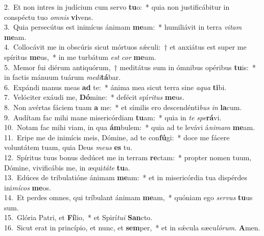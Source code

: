 {2.~}Et non intres in judícium cum servo \textbf{tu}o:~* quia non justificábitur in conspéctu tuo \textit{om}\textit{nis} \textbf{vi}vens.\\
{3.~}Quia persecútus est inimícus ánimam \textbf{me}am:~* humiliávit in terra \textit{vi}\textit{tam} \textbf{me}am.\\
{4.~}Collocávit me in obscúris sicut mórtuos sǽculi:~† et anxiátus est super me spíritus \textbf{me}us,~* in me turbátum \textit{est} \textit{cor} \textbf{me}um.\\
{5.~}Memor fui diérum antiquórum,~† meditátus sum in ómnibus opéribus \textbf{tu}is:~* in factis mánuum tuárum \textit{me}\textit{di}\textbf{tá}bar.\\
{6.~}Expándi manus meas \textbf{ad} te:~* ánima mea sicut terra sine \textit{a}\textit{qua} \textbf{ti}bi.\\
{7.~}Velóciter exáudi me, \textbf{Dó}mine:~* defécit spí\textit{ri}\textit{tus} \textbf{me}us.\\
{8.~}Non avértas fáciem tuam \textbf{a} me:~* et símilis ero descendénti\textit{bus} \textit{in} \textbf{la}cum.\\
{9.~}Audítam fac mihi mane misericórdiam \textbf{tu}am:~* quia in \textit{te} \textit{spe}\textbf{rá}vi.\\
{10.~}Notam fac mihi viam, in qua \textbf{ám}bulem:~* quia ad te levávi á\textit{ni}\textit{mam} \textbf{me}am.\\
{11.~}Eripe me de inimícis meis, Dómine, ad te con\textbf{fú}gi:~* doce me fácere voluntátem tuam, quia Deus \textit{me}\textit{us} \textbf{es} tu.\\
{12.~}Spíritus tuus bonus dedúcet me in terram \textbf{re}ctam:~* propter nomen tuum, Dómine, vivificábis me, in æqui\textit{tá}\textit{te} \textbf{tu}a.\\
{13.~}Edúces de tribulatióne ánimam \textbf{me}am:~* et in misericórdia tua dispérdes ini\textit{mí}\textit{cos} \textbf{me}os.\\
{14.~}Et perdes omnes, qui tríbulant ánimam \textbf{me}am,~* quóniam ego \textit{ser}\textit{vus} \textbf{tu}us sum.\\
{15.~}Glória Patri, et \textbf{Fí}lio,~* et Spirí\textit{tu}\textit{i} \textbf{San}cto.\\
{16.~}Sicut erat in princípio, et nunc, et \textbf{sem}per,~* et in sǽcula sæcu\textit{ló}\textit{rum}. \textbf{A}men.\\
